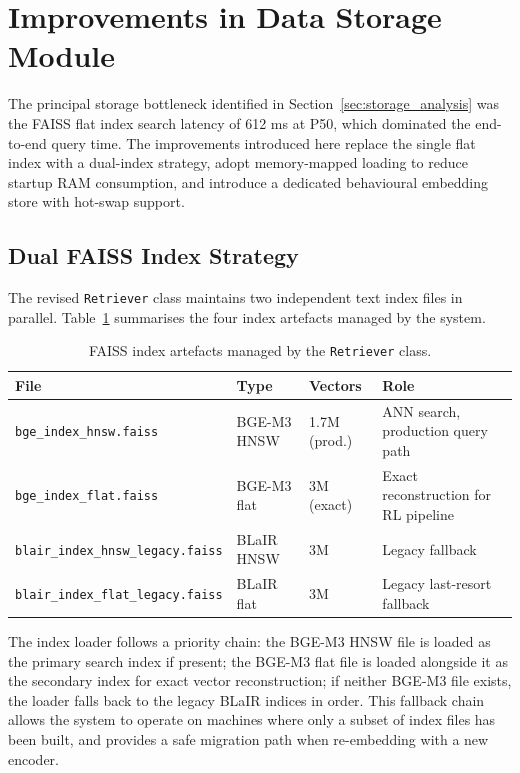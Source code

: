 \section{Improvements in Data Storage Module}
\label{sec:storage_improvements}

The principal storage bottleneck identified in Section~\ref{sec:storage_analysis} was the FAISS flat index search latency of 612 ms at P50, which dominated the end-to-end query time.
The improvements introduced here replace the single flat index with a dual-index strategy, adopt memory-mapped loading to reduce startup RAM consumption, and introduce a dedicated behavioural embedding store with hot-swap support.

\subsection{Dual FAISS Index Strategy}
\label{sec:dual_index}

The revised \texttt{Retriever} class maintains two independent text index files in parallel.
Table~\ref{tab:index_files} summarises the four index artefacts managed by the system.

\begin{table}[H]
\centering
\caption{FAISS index artefacts managed by the \texttt{Retriever} class.}
\label{tab:index_files}
\begin{tabular}{p{4.5cm} p{2.0cm} p{2.0cm} p{4.0cm}}
\hline
\textbf{File} & \textbf{Type} & \textbf{Vectors} & \textbf{Role} \\
\hline
\nolinkurl{bge_index_hnsw.faiss}        & BGE-M3 HNSW  & 1.7M (prod.) & ANN search, production query path \\
\nolinkurl{bge_index_flat.faiss}        & BGE-M3 flat  & 3M (exact)   & Exact reconstruction for RL pipeline \\
\nolinkurl{blair_index_hnsw_legacy.faiss} & BLaIR HNSW  & 3M           & Legacy fallback \\
\nolinkurl{blair_index_flat_legacy.faiss} & BLaIR flat  & 3M           & Legacy last-resort fallback \\
\hline
\end{tabular}
\end{table}

The index loader follows a priority chain: the BGE-M3 HNSW file is loaded as the primary search index if present; the BGE-M3 flat file is loaded alongside it as the secondary index for exact vector reconstruction; if neither BGE-M3 file exists, the loader falls back to the legacy BLaIR indices in order.
This fallback chain allows the system to operate on machines where only a subset of index files has been built, and provides a safe migration path when re-embedding with a new encoder.

